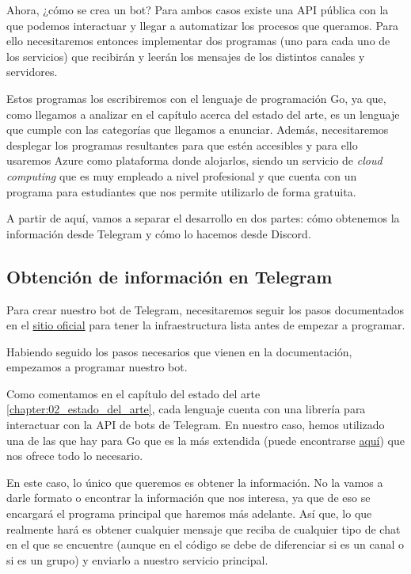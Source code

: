 Ahora, ¿cómo se crea un bot? Para ambos casos existe una API pública con la que 
podemos interactuar y llegar a automatizar los procesos que queramos. Para ello 
necesitaremos entonces implementar dos programas (uno para cada uno de los 
servicios) que recibirán y leerán los mensajes de los distintos canales y 
servidores.

Estos programas los escribiremos con el lenguaje de programación Go, ya que, como 
llegamos a analizar en el capítulo acerca del estado del arte, es un lenguaje que 
cumple con las categorías que llegamos a enunciar. Además, necesitaremos desplegar 
los programas resultantes para que estén accesibles y para ello usaremos Azure 
como plataforma donde alojarlos, siendo un servicio de \textit{cloud computing} 
que es muy empleado a nivel profesional y que cuenta con un programa para 
estudiantes que nos permite utilizarlo de forma gratuita.

A partir de aquí, vamos a separar el desarrollo en dos partes: cómo obtenemos la 
información desde Telegram y cómo lo hacemos desde Discord.

\subsection{Obtención de información en Telegram}

Para crear nuestro bot de Telegram, necesitaremos seguir los pasos documentados en 
el \href{https://core.telegram.org/bots#how-do-i-create-a-bot}{sitio oficial} para 
tener la infraestructura lista antes de empezar a programar.

Habiendo seguido los pasos necesarios que vienen en la documentación, empezamos a 
programar nuestro bot.

Como comentamos en el capítulo del estado del arte \ref{chapter:02_estado_del_arte}, 
cada lenguaje cuenta con una librería para interactuar con la API de bots de 
Telegram. En nuestro caso, hemos utilizado una de las que hay para Go que es la más 
extendida (puede encontrarse 
\href{https://pkg.go.dev/github.com/go-telegram-bot-api/telegram-bot-api/v5}{aquí}) 
que nos ofrece todo lo necesario.

En este caso, lo único que queremos es obtener la información. No la vamos a darle 
formato o encontrar la información que nos interesa, ya que de eso se encargará el 
programa principal que haremos más adelante. Así que, lo que realmente hará es 
obtener cualquier mensaje que reciba de cualquier tipo de chat en el que se 
encuentre (aunque en el código se debe de diferenciar si es un canal o si es un 
grupo) y enviarlo a nuestro servicio principal.
